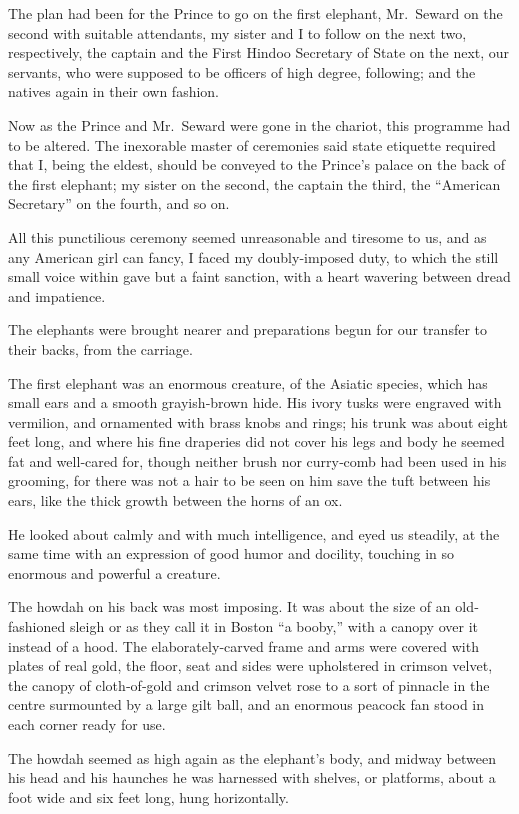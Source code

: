 \documentclass[12pt]{book}
\begin{document}
The plan had been for the Prince to go on the first elephant, Mr.~Seward on
the second with suitable attendants, my sister and I to follow on the next two,
respectively, the captain and the First Hindoo Secretary of State on the next, our
servants, who were supposed to be officers of high degree, following; and the
natives again in their own fashion.

Now as the Prince and Mr.~Seward were gone in the chariot, this programme
had to be altered. The inexorable master of ceremonies said state etiquette required
that I, being the eldest, should be conveyed to the Prince’s palace on the back of
the first elephant; my sister on the second, the captain the third, the “American
Secretary” on the fourth, and so on.

All this punctilious ceremony seemed unreasonable and tiresome to us, and
as any American girl can fancy, I faced my doubly‐imposed duty, to which the
still small voice within gave but a faint sanction, with a heart wavering between
dread and impatience.

The elephants were brought nearer and preparations begun for our transfer
to their backs, from the carriage.

The first elephant was an enormous creature, of the Asiatic species, which has
small ears and a smooth grayish‐brown hide. His ivory tusks were engraved with
vermilion, and ornamented with brass knobs and rings; his trunk was about eight
feet long, and where his fine draperies did not cover his legs and body he seemed
fat and well‐cared for, though neither brush nor curry‐comb had been used in his
grooming, for there was not a hair to be seen on him save the tuft between his
ears, like the thick growth between the horns of an ox.

He looked about calmly and with much intelligence, and eyed us steadily, at
the same time with an expression of good humor and docility, touching in so
enormous and powerful a creature.

The howdah on his back was most imposing. It was about the size of an
old‐fashioned sleigh or as they call it in Boston “a booby,” with a canopy over
it instead of a hood. The elaborately‐carved frame and arms were covered with
plates of real gold, the floor, seat and sides were upholstered in crimson velvet,
the canopy of cloth‐of‐gold and crimson velvet rose to a sort of pinnacle in the
centre surmounted by a large gilt ball, and an enormous peacock fan stood in
each corner ready for use.

The howdah seemed as high again as the elephant’s body, and midway between
his head and his haunches he was harnessed with shelves, or platforms, about a
foot wide and six feet long, hung horizontally.
\end{document}
